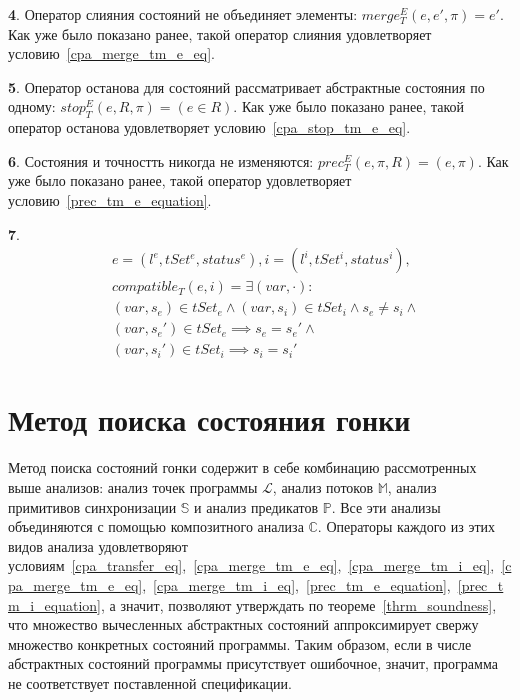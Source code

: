 

{\textbf 4.} Оператор слияния состояний не объединяет элементы: $merge^E_T(e, e', \pi) = e'$. Как уже было показано ранее, такой оператор слияния удовлетворяет условию~\ref{cpa_merge_tm_e_eq}.

{\textbf 5.} Оператор останова для состояний рассматривает абстрактные состояния по одному: $stop^E_T(e, R, \pi) = (e \in R)$. Как уже было показано ранее, такой оператор останова удовлетворяет условию~\ref{cpa_stop_tm_e_eq}.

{\textbf 6.} Состояния и точностть никогда не изменяются: $prec^E_T(e, \pi, R) = (e, \pi)$. Как уже было показано ранее, такой оператор удовлетворяет условию~\ref{prec_tm_e_equation}.

{\textbf 7.} 
\begin{equation}
\label{compatible_thread}
\begin{aligned}
& e = (l^e, tSet^e, status^e), i = (l^i, tSet^i, status^i), \\
& compatible_T(e,i) = \exists (var, \cdot): \\
& (var, s_e) \in tSet_e \land  (var, s_i) \in tSet_i \land s_e \neq s_i \land \\
& (var, s_e') \in tSet_e \implies s_e = s_e' \land \\
& (var, s_i') \in tSet_i \implies s_i = s_i'
\end{aligned}
\end{equation}

\section{Метод поиска состояния гонки}

Метод поиска состояний гонки содержит в себе комбинацию рассмотренных выше анализов: анализ точек программы $\mathcal{L}$, анализ потоков $\mathbb{M}$, анализ примитивов синхронизации $\mathbb{S}$ и анализ предикатов $\mathbb{P}$. 
Все эти анализы объединяются с помощью композитного анализа $\mathbb{C}$.
Операторы каждого из этих видов анализа удовлетворяют условиям~\ref{cpa_transfer_eq},~\ref{cpa_merge_tm_e_eq},~\ref{cpa_merge_tm_i_eq},~\ref{cpa_merge_tm_e_eq},~\ref{cpa_merge_tm_i_eq},~\ref{prec_tm_e_equation},~\ref{prec_tm_i_equation}, а значит, позволяют утверждать по теореме~\ref{thrm_soundness}, что множество вычесленных абстрактных состояний аппроксимирует свержу множество конкретных состояний программы.
Таким образом, если в числе абстрактных состояний программы присутствует ошибочное, значит, программа не соответствует поставленной спецификации.

